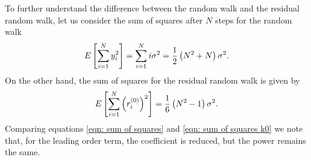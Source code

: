 \documentclass[../full_thesis/full_thesis.tex]{subfiles}
\begin{document}
\begin{subappendices}
To further understand the difference between the random walk and
the residual random walk, let us consider the sum of squares after $N$ steps for
the random walk
\begin{equation}
E\left[\sum_{i=1}^{N} y_{i}^{2}\right] = \sum_{i=1}^{N} i \sigma^{2} =
                               \frac{1}{2}\left(N^{2} + N\right)\sigma^{2}.
\label{eqn: sum of squares}
\end{equation}
On the other hand, the sum of squares for the residual random walk is given by
\begin{equation}
E\left[\sum_{i=1}^{N} \left(r^{(0)}_{i}\right)^{2}\right] =
\frac{1}{6}\left(N^{2} -1\right)\sigma^{2}.
\label{eqn: sum of squares k0}
\end{equation}
Comparing equations \eqref{eqn: sum of squares} and \eqref{eqn: sum of squares
k0} we note that, for the leading order term, the coefficient is reduced, but
the power remains the same.

%


\end{subappendices}
\end{document}
